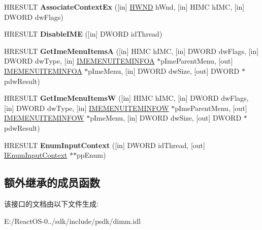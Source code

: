 \begin{DoxyCompactItemize}
\item 
\mbox{\label{interface_i_active_i_m_m_app_a3f857897e5db8579780b58745e2f112c}} 
H\+R\+E\+S\+U\+LT {\bfseries Associate\+Context\+Ex} (\mbox{[}in\mbox{]} \hyperlink{interfacevoid}{H\+W\+ND} h\+Wnd, \mbox{[}in\mbox{]} H\+I\+MC h\+I\+MC, \mbox{[}in\mbox{]} D\+W\+O\+RD dw\+Flags)
\item 
\mbox{\label{interface_i_active_i_m_m_app_a59fcf9a881fcaf2a39ed7b069f549e05}} 
H\+R\+E\+S\+U\+LT {\bfseries Disable\+I\+ME} (\mbox{[}in\mbox{]} D\+W\+O\+RD id\+Thread)
\item 
\mbox{\label{interface_i_active_i_m_m_app_a4a4eaf8c32274a714daf652e8e6e5400}} 
H\+R\+E\+S\+U\+LT {\bfseries Get\+Ime\+Menu\+ItemsA} (\mbox{[}in\mbox{]} H\+I\+MC h\+I\+MC, \mbox{[}in\mbox{]} D\+W\+O\+RD dw\+Flags, \mbox{[}in\mbox{]} D\+W\+O\+RD dw\+Type, \mbox{[}in\mbox{]} \hyperlink{struct_i_m_e_m_e_n_u_i_t_e_m_i_n_f_o_a}{I\+M\+E\+M\+E\+N\+U\+I\+T\+E\+M\+I\+N\+F\+OA} $\ast$p\+Ime\+Parent\+Menu, \mbox{[}out\mbox{]} \hyperlink{struct_i_m_e_m_e_n_u_i_t_e_m_i_n_f_o_a}{I\+M\+E\+M\+E\+N\+U\+I\+T\+E\+M\+I\+N\+F\+OA} $\ast$p\+Ime\+Menu, \mbox{[}in\mbox{]} D\+W\+O\+RD dw\+Size, \mbox{[}out\mbox{]} D\+W\+O\+RD $\ast$pdw\+Result)
\item 
\mbox{\label{interface_i_active_i_m_m_app_adf5ee962ba2628146174b6cecbaf0599}} 
H\+R\+E\+S\+U\+LT {\bfseries Get\+Ime\+Menu\+ItemsW} (\mbox{[}in\mbox{]} H\+I\+MC h\+I\+MC, \mbox{[}in\mbox{]} D\+W\+O\+RD dw\+Flags, \mbox{[}in\mbox{]} D\+W\+O\+RD dw\+Type, \mbox{[}in\mbox{]} \hyperlink{struct_i_m_e_m_e_n_u_i_t_e_m_i_n_f_o_w}{I\+M\+E\+M\+E\+N\+U\+I\+T\+E\+M\+I\+N\+F\+OW} $\ast$p\+Ime\+Parent\+Menu, \mbox{[}out\mbox{]} \hyperlink{struct_i_m_e_m_e_n_u_i_t_e_m_i_n_f_o_w}{I\+M\+E\+M\+E\+N\+U\+I\+T\+E\+M\+I\+N\+F\+OW} $\ast$p\+Ime\+Menu, \mbox{[}in\mbox{]} D\+W\+O\+RD dw\+Size, \mbox{[}out\mbox{]} D\+W\+O\+RD $\ast$pdw\+Result)
\item 
\mbox{\label{interface_i_active_i_m_m_app_ac25dcd0acbbecdd0e9a854579acae494}} 
H\+R\+E\+S\+U\+LT {\bfseries Enum\+Input\+Context} (\mbox{[}in\mbox{]} D\+W\+O\+RD id\+Thread, \mbox{[}out\mbox{]} \hyperlink{interface_i_enum_input_context}{I\+Enum\+Input\+Context} $\ast$$\ast$pp\+Enum)
\end{DoxyCompactItemize}
\subsection*{额外继承的成员函数}


该接口的文档由以下文件生成\+:\begin{DoxyCompactItemize}
\item 
E\+:/\+React\+O\+S-\/0../sdk/include/psdk/dimm.\+idl\end{DoxyCompactItemize}

